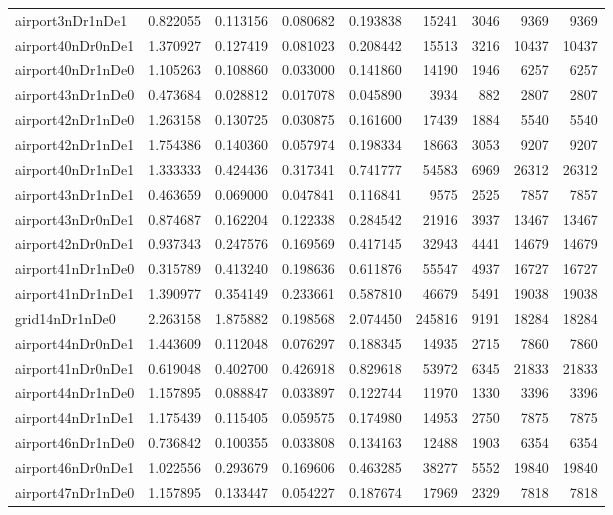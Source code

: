 \begin{longtable}{|l|r|r|r|r|r|r|r|r|}
airport3nDr1nDe1 & 0.822055 & 0.113156 & 0.080682 & 0.193838 & 15241 & 3046 & 9369 & 9369 \\
airport40nDr0nDe1 & 1.370927 & 0.127419 & 0.081023 & 0.208442 & 15513 & 3216 & 10437 & 10437 \\
airport40nDr1nDe0 & 1.105263 & 0.108860 & 0.033000 & 0.141860 & 14190 & 1946 & 6257 & 6257 \\
airport43nDr1nDe0 & 0.473684 & 0.028812 & 0.017078 & 0.045890 & 3934 & 882 & 2807 & 2807 \\
airport42nDr1nDe0 & 1.263158 & 0.130725 & 0.030875 & 0.161600 & 17439 & 1884 & 5540 & 5540 \\
airport42nDr1nDe1 & 1.754386 & 0.140360 & 0.057974 & 0.198334 & 18663 & 3053 & 9207 & 9207 \\
airport40nDr1nDe1 & 1.333333 & 0.424436 & 0.317341 & 0.741777 & 54583 & 6969 & 26312 & 26312 \\
airport43nDr1nDe1 & 0.463659 & 0.069000 & 0.047841 & 0.116841 & 9575 & 2525 & 7857 & 7857 \\
airport43nDr0nDe1 & 0.874687 & 0.162204 & 0.122338 & 0.284542 & 21916 & 3937 & 13467 & 13467 \\
airport42nDr0nDe1 & 0.937343 & 0.247576 & 0.169569 & 0.417145 & 32943 & 4441 & 14679 & 14679 \\
airport41nDr1nDe0 & 0.315789 & 0.413240 & 0.198636 & 0.611876 & 55547 & 4937 & 16727 & 16727 \\
airport41nDr1nDe1 & 1.390977 & 0.354149 & 0.233661 & 0.587810 & 46679 & 5491 & 19038 & 19038 \\
grid14nDr1nDe0 & 2.263158 & 1.875882 & 0.198568 & 2.074450 & 245816 & 9191 & 18284 & 18284 \\
airport44nDr0nDe1 & 1.443609 & 0.112048 & 0.076297 & 0.188345 & 14935 & 2715 & 7860 & 7860 \\
airport41nDr0nDe1 & 0.619048 & 0.402700 & 0.426918 & 0.829618 & 53972 & 6345 & 21833 & 21833 \\
airport44nDr1nDe0 & 1.157895 & 0.088847 & 0.033897 & 0.122744 & 11970 & 1330 & 3396 & 3396 \\
airport44nDr1nDe1 & 1.175439 & 0.115405 & 0.059575 & 0.174980 & 14953 & 2750 & 7875 & 7875 \\
airport46nDr1nDe0 & 0.736842 & 0.100355 & 0.033808 & 0.134163 & 12488 & 1903 & 6354 & 6354 \\
airport46nDr0nDe1 & 1.022556 & 0.293679 & 0.169606 & 0.463285 & 38277 & 5552 & 19840 & 19840 \\
airport47nDr1nDe0 & 1.157895 & 0.133447 & 0.054227 & 0.187674 & 17969 & 2329 & 7818 & 7818 \\

\end{longtable}
